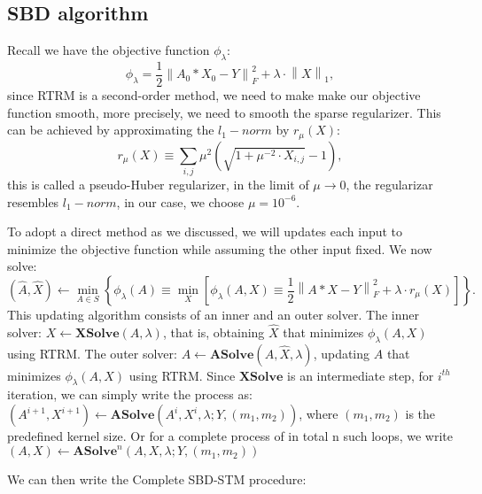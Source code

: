 \subsection{SBD algorithm}
Recall we have the objective function $\phi_{\lambda}$: 
\begin{equation}
	\phi_{\lambda} = \frac{1}{2}\left\lVert A_0 * X_0 - Y \right\rVert^2_F + \lambda \cdot  \left\lVert X\right\rVert_1,
\end{equation}
since \ac{RTRM} is a second-order method, we need to make make our objective function smooth, more precisely, we need to smooth the sparse regularizer. This can be achieved by approximating the $l_1-norm$ by $r_{\mu}(X)$:
\begin{equation}
	r_{\mu}(X) \equiv \sum_{i,j} \mu^2(\sqrt{1+\mu^{-2}\cdot X_{i,j}}-1), 
\end{equation}
this is called a pseudo-Huber regularizer, in the limit of $\mu \rightarrow 0$, the regularizar resembles $l_1-norm$, in our case, we choose $\mu = 10^{-6}$. 

To adopt a direct method as we discussed, we will updates each input to minimize the objective function while assuming the other input fixed. We now solve: 
\begin{equation}
	\label{sbdalgorithm}
	(\hat{A}, \hat{X}) \leftarrow \min_{{A} \in {S}} \left\{ 
	\phi_{\lambda}({A}) \equiv \min_{X} \left[ 
	\phi_{\lambda}({A}, {X}) \equiv \frac{1}{2} \left\| {A} * {X} - {Y} \right\|_F^2 
	+ \lambda \cdot r_{\mu}({X}) 
	\right] 
	\right\}.
\end{equation}
This updating algorithm consists of an inner and an outer solver. The inner solver: $X \leftarrow \mathbf{XSolve}(A, \lambda)$, that is, obtaining $\hat{X}$ that minimizes $\phi_{\lambda}(A,X)$ using \ac{RTRM}. The outer solver: $A \leftarrow \mathbf{ASolve}(A, \hat{X}, \lambda)$, updating $A$ that minimizes $\phi_{\lambda}(A,X)$ using \ac{RTRM}. Since $\mathbf{XSolve}$ is an intermediate step, for $i^{th}$ iteration, we can simply write the process as: $(A^{i+1}, X^{i+1}) \leftarrow \mathbf{ASolve}(A^{i}, X^{i}, \lambda; Y,(m_1,m_2))$, where $(m_1,m_2)$ is the predefined kernel size. Or for a complete process of in total n such loops, we write $(A, X) \leftarrow \mathbf{ASolve}^n(A, X, \lambda; Y,(m_1,m_2))$

We can then write the Complete SBD-STM procedure: 

